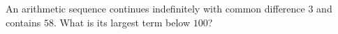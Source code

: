 An arithmetic sequence continues indefinitely with common difference $3$ and contains $58$. What is its largest term below $100$?
